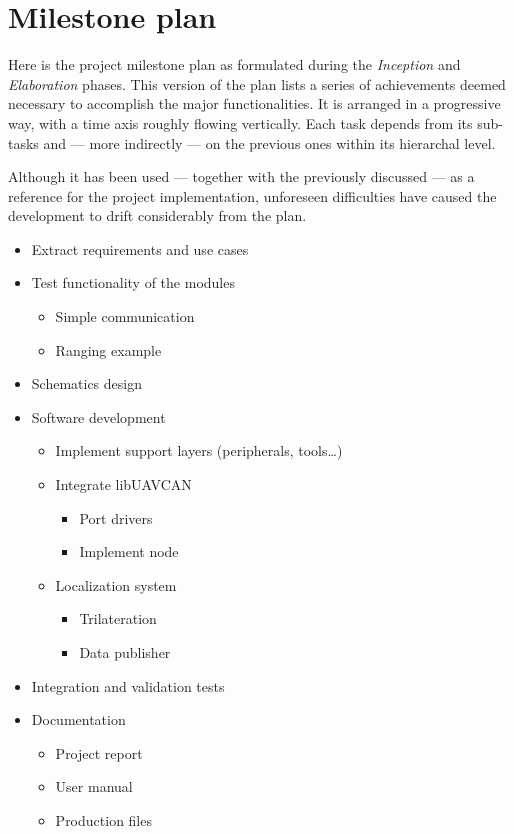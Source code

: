 \section{Milestone plan}

Here is the project milestone plan as formulated during the \emph{Inception} and \emph{Elaboration} phases.
This version of the plan lists a series of achievements deemed necessary to accomplish the major functionalities.
It is arranged in a progressive way, with a time axis roughly flowing vertically.
Each task depends from its sub-tasks and --- more indirectly --- on the previous ones within its hierarchal level.

Although it has been used --- together with the previously discussed  --- as a reference for the project implementation, unforeseen difficulties have caused the development to drift considerably from the plan.

\renewcommand{\labelitemi}{\textbullet}
\renewcommand{\labelitemii}{\textbullet}
\renewcommand{\labelitemiii}{\textbullet}
\renewcommand{\labelitemiv}{\textbullet}
\begin{itemize}
\item Extract requirements and use cases
\item Test functionality of the modules
	\begin{itemize}
	\item Simple communication
	\item Ranging example
\end{itemize}
\item Schematics design
\item Software development
	\begin{itemize}
	\item Implement support layers (peripherals, tools\dots)
	\item Integrate libUAVCAN
	\begin{itemize}
		\item Port drivers
		\item Implement node
	\end{itemize}
	\item Localization system
	\begin{itemize}
		\item Trilateration
		\item Data publisher
	\end{itemize}
\end{itemize}
\item Integration and validation tests
\item Documentation
	\begin{itemize}
	\item Project report
	\item User manual
	\item Production files
\end{itemize}
\end{itemize}
